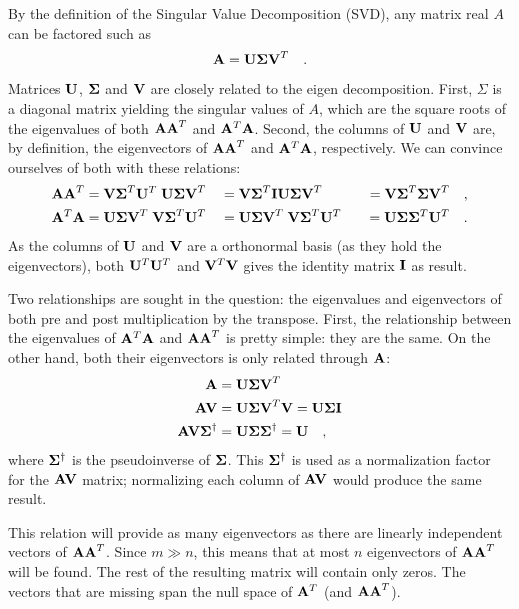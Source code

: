 \documentclass{report}
\begin{document}
By the definition of the Singular Value Decomposition (SVD), any matrix real $A$ can be factored such as
\begin{equation}
\mathbf{A} = \mathbf{U \Sigma V}^T \quad.
\end{equation}
Matrices $\mathbf{U}$, $\mathbf{\Sigma}$ and $\mathbf{V}$ are closely related to the eigen decomposition. First, $\Sigma$ is a diagonal matrix yielding the singular values of $A$, which are the square roots of the eigenvalues of both $\mathbf{AA}^T$ and $\mathbf{A}^T\mathbf{A}$. Second, the columns of $\mathbf{U}$ and $\mathbf{V}$ are, by definition, the eigenvectors of $\mathbf{AA}^T$ and $\mathbf{A}^T\mathbf{A}$, respectively. We can convince ourselves of both with these relations:
\begin{align*}
\mathbf{AA}^T           &= \mathbf{V\Sigma}^T\mathbf{U}^T \; \mathbf{U\Sigma V}^T
                        &&= \mathbf{V\Sigma}^T\mathbf{IU\Sigma V}^T 
                        &&&= \mathbf{V\Sigma}^T\mathbf{\Sigma V}^T \quad,\\
\mathbf{A}^T\mathbf{A}  &= \mathbf{U\Sigma V}^T \; \mathbf{V\Sigma}^T\mathbf{U}^T
                        &&= \mathbf{U\Sigma V}^T \; \mathbf{V\Sigma}^T\mathbf{U}^T
                        &&&= \mathbf{U\Sigma}\mathbf{\Sigma}^T\mathbf{U}^T \quad.
\end{align*}
As the columns of $\mathbf{U}$ and $\mathbf{V}$ are a orthonormal basis (as they hold the eigenvectors), both $\mathbf{U}^T\mathbf{U}^T$ and $\mathbf{V}^T\mathbf{V}$ gives the identity matrix $\mathbf{I}$ as result.

Two relationships are sought in the question: the eigenvalues and eigenvectors of both pre and post multiplication by the transpose. First, the relationship between the eigenvalues of $\mathbf{A}^T\mathbf{A}$ and $\mathbf{AA}^T$ is pretty simple: they are the same. On the other hand, both their eigenvectors is only related through $\mathbf{A}$:
\begin{align*}
\mathbf{A}  &= \mathbf{U \Sigma V}^T \\
\mathbf{AV} &= \mathbf{U \Sigma V}^T \mathbf{V} = \mathbf{U \Sigma I} \\
\mathbf{AV\Sigma}^\dagger &= \mathbf{U \Sigma \Sigma}^\dagger = \mathbf{U} \quad,
\end{align*}
where $\mathbf{\Sigma}^\dagger$ is the pseudoinverse of $\mathbf{\Sigma}$. This $\mathbf{\Sigma}^\dagger$ is used as a normalization factor for the $\mathbf{AV}$ matrix; normalizing each column of $\mathbf{AV}$ would produce the same result.

This relation will provide as many eigenvectors as there are linearly independent vectors of $\mathbf{AA}^T$. Since $m \gg n$, this means that at most $n$ eigenvectors of $\mathbf{AA}^T$ will be found. The rest of the resulting matrix will contain only zeros. The vectors that are missing span the null space of $\mathbf{A}^T$ (and $\mathbf{AA}^T$).
\end{document}
